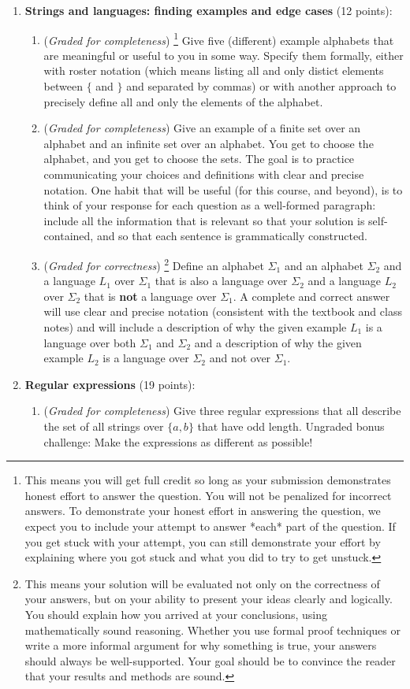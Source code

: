 \documentclass[12pt, oneside]{article}
\newcommand{\gradeCorrect}{({\it Graded for correctness}) }
\newcommand{\gradeCorrectFirst}{\gradeCorrect\footnote{This means your solution 
will be evaluated not only on the correctness of your answers, but on your ability
to present your ideas clearly and logically. You should explain how you 
arrived at your conclusions, using
mathematically sound reasoning. Whether you use formal proof techniques or 
write a more informal argument
for why something is true, your answers should always be well-supported. 
Your goal should be to convince the
reader that your results and methods are sound.} }
\newcommand{\gradeComplete}{({\it Graded for completeness}) }
\newcommand{\gradeCompleteFirst}{\gradeComplete\footnote{This means you will 
get full credit so long as your submission demonstrates honest effort to 
answer the question. You will not be penalized for incorrect answers. 
To demonstrate your honest effort in answering the question, we 
expect you to include your attempt to answer *each* part of the question. 
If you get stuck with your attempt, you can still demonstrate 
your effort by explaining where you got stuck and what 
you did to try to get unstuck.} }
\begin{document}
\begin{enumerate}[wide, labelwidth=!, labelindent=0pt]
\item\textbf{Strings and languages: finding examples and edge cases} (12 points):
    \begin{enumerate}
    \item\gradeCompleteFirst  Give five (different) example alphabets that are meaningful or useful to you in some way. Specify them formally, either with 
    roster notation (which means listing all and only distict elements between $\{$ and $\}$ and separated by commas) or with another approach to precisely define all and only the elements of the alphabet.

    \item\gradeComplete Give an example of a finite set over an alphabet  and an infinite set over an alphabet. You get to choose the alphabet, and you get to choose the sets.  The goal is to practice communicating your choices and definitions with clear and precise notation. One habit that will be useful (for this course, and beyond), is to think of your response for each question as a well-formed paragraph: include all the information that is relevant so that your solution is self-contained, and so that each sentence is grammatically constructed.
    
    \item\gradeCorrectFirst Define an alphabet $\Sigma_1$ and an alphabet $\Sigma_2$ and a language $L_1$ over $\Sigma_1$ that is also a language over $\Sigma_2$ and a language $L_2$ over $\Sigma_2$ that is {\bf not} a language over $\Sigma_1$. 
    A complete and correct answer will use clear and precise notation
    (consistent with the textbook and class notes) and will include a description of why the given example $L_1$
    is a language over both $\Sigma_1$ and $\Sigma_2$ and a description 
    of why the given example $L_2$ is a language over $\Sigma_2$ and not over $\Sigma_1$.

    \end{enumerate}

\item\textbf{Regular expressions} (19 points):

    \begin{enumerate}
    \item\gradeComplete  Give three regular expressions that all describe the set of all strings over $\{a,b\}$ that have 
    odd length. Ungraded bonus challenge: Make the expressions as different as possible!


\end{enumerate}
\end{enumerate}
\end{document}
